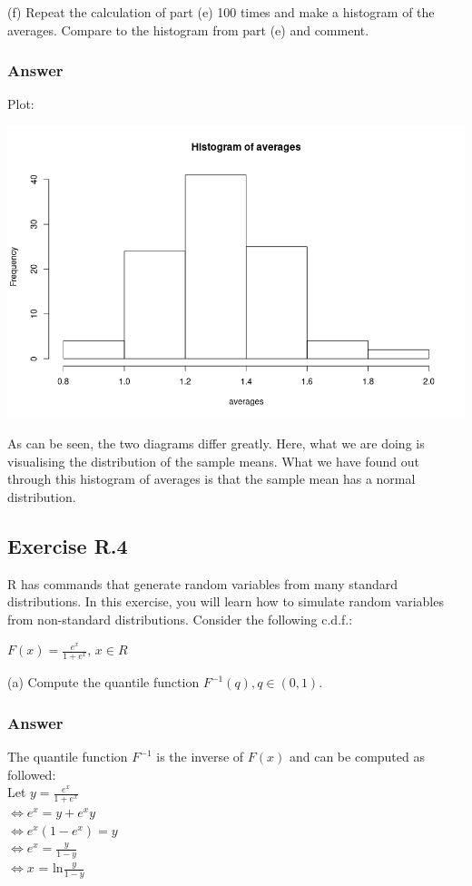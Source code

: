 \documentclass[12pt]{article}
\begin{document}
(f) Repeat the calculation of part (e) 100 times and make a histogram of the averages. Compare to the histogram from part (e) and comment.
\subsubsection*{Answer}
Plot:

\includegraphics[width=\textwidth]{Ex3Plot3} 

As can be seen, the two diagrams differ greatly. Here, what we are doing is visualising the distribution of the sample means. What we have found out through this histogram of averages is that the sample mean has a normal distribution.

\subsection*{Exercise R.4}
R has commands that generate random variables from many standard distributions. In this exercise, you will learn how to simulate random variables from non-standard distributions. Consider the following c.d.f.:

$F(x) = \frac{e^{x}}{1 + e^{x}}$, $x \in R$

(a) Compute the quantile function $F^{-1}(q), q \in (0, 1)$.
\subsubsection*{Answer}
The quantile function $F^{-1}$ is the inverse of $F(x)$ and can be computed as followed:\\
Let $y= \frac{e^{x}}{1+e^{x}}$\\
$\Leftrightarrow e^{x} = y + e^{x}y$\\
$\Leftrightarrow e^{x}(1 - e^{x}) = y$\\
$\Leftrightarrow e^{x} = \frac{y}{1-y}$\\
$\Leftrightarrow x$ = ln$\frac{y}{1-y}$
\end{document}
